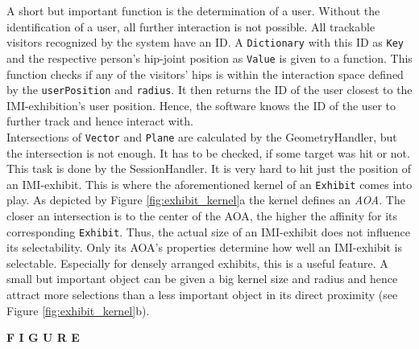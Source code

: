 A short but important function is the determination of a user. Without the identification of a user, all further interaction is not possible. All trackable visitors recognized by the system have an \ac{ID}. A \texttt{Dictionary} with this \ac{ID} as \texttt{Key} and the respective person's hip-joint position as \texttt{Value} is given to a function. This function checks if any of the visitors' hips is within the interaction space defined by the \texttt{userPosition} and \texttt{radius}. It then returns the \ac{ID} of the user closest to the \ac{IMI}-exhibition's user position. Hence, the software knows the \ac{ID} of the user to further track and hence interact with.
\\
Intersections of \texttt{Vector} and \texttt{Plane} are calculated by the GeometryHandler, but the intersection is not enough. It has to be checked, if some target was hit or not. This task is done by the SessionHandler. It is very hard to hit just the position of an \ac{IMI}-exhibit. This is where the aforementioned kernel of an \texttt{Exhibit} comes into play. As depicted by Figure \ref{fig:exhibit_kernel}a the kernel defines an \textit{\ac{AOA}}. The closer an intersection is to the center of the \ac{AOA}, the higher the affinity for its corresponding \texttt{Exhibit}. Thus, the actual size of an \ac{IMI}-exhibit does not influence its selectability. Only its \ac{AOA}'s properties determine how well an \ac{IMI}-exhibit is selectable. Especially for densely arranged exhibits, this is a useful feature. A small but important object can be given a big kernel size and radius and hence attract more selections than a less important object in its direct proximity (see Figure \ref{fig:exhibit_kernel}b).

\textbf{F I G U R E}

